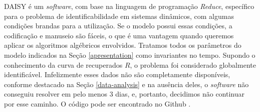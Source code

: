 DAISY é um {\it software}, com base na linguagem de programação {\it Reduce},
específico para o problema de identificabilidade em sistemas dinâmicos, com
algumas condições brandas para a utilização. 
Se o modelo possui essas condições, a codificação e manuseio são fáceis, o que é
uma vantagem quando queremos aplicar os algoritmos algébricos envolvidos. 
Tratamos todos os parâmetros do modelo indicados na Seção \ref{apresentation} como
invariantes no tempo. 
Supondo o conhecimento da curva de recuperados $R$, o problema foi considerado
globalmente identificável. 
Infelizmente esses dados não são completamente disponíveis, conforme destacado
na Seção \ref{data-analysis} e na ausência deles,  o {\it software} não conseguiu
resolver em pelo menos 3 dias, e, portanto, decidimos não continuar por esse 
caminho. 
O código pode ser encontrado no Github \cite{github}.